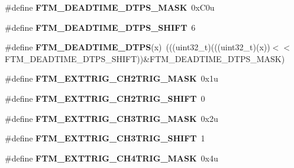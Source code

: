 \begin{DoxyCompactItemize}
\item 
\#define {\bfseries F\+T\+M\+\_\+\+D\+E\+A\+D\+T\+I\+M\+E\+\_\+\+D\+T\+P\+S\+\_\+\+M\+A\+SK}~0x\+C0u\hypertarget{group__FTM__Register__Masks_gae0402be742f84b93af5306ac6a61706f}{}\label{group__FTM__Register__Masks_gae0402be742f84b93af5306ac6a61706f}

\item 
\#define {\bfseries F\+T\+M\+\_\+\+D\+E\+A\+D\+T\+I\+M\+E\+\_\+\+D\+T\+P\+S\+\_\+\+S\+H\+I\+FT}~6\hypertarget{group__FTM__Register__Masks_gaa42cc1f2612186f882762059b910cd7a}{}\label{group__FTM__Register__Masks_gaa42cc1f2612186f882762059b910cd7a}

\item 
\#define {\bfseries F\+T\+M\+\_\+\+D\+E\+A\+D\+T\+I\+M\+E\+\_\+\+D\+T\+PS}(x)~(((uint32\+\_\+t)(((uint32\+\_\+t)(x))$<$$<$F\+T\+M\+\_\+\+D\+E\+A\+D\+T\+I\+M\+E\+\_\+\+D\+T\+P\+S\+\_\+\+S\+H\+I\+FT))\&F\+T\+M\+\_\+\+D\+E\+A\+D\+T\+I\+M\+E\+\_\+\+D\+T\+P\+S\+\_\+\+M\+A\+SK)\hypertarget{group__FTM__Register__Masks_gaf1a7c61f4e08ca45f70154070500695d}{}\label{group__FTM__Register__Masks_gaf1a7c61f4e08ca45f70154070500695d}

\item 
\#define {\bfseries F\+T\+M\+\_\+\+E\+X\+T\+T\+R\+I\+G\+\_\+\+C\+H2\+T\+R\+I\+G\+\_\+\+M\+A\+SK}~0x1u\hypertarget{group__FTM__Register__Masks_ga156b1af5902f975c8d6b667e77ce11da}{}\label{group__FTM__Register__Masks_ga156b1af5902f975c8d6b667e77ce11da}

\item 
\#define {\bfseries F\+T\+M\+\_\+\+E\+X\+T\+T\+R\+I\+G\+\_\+\+C\+H2\+T\+R\+I\+G\+\_\+\+S\+H\+I\+FT}~0\hypertarget{group__FTM__Register__Masks_ga6bd01126a4e39a0ccf9446da55a86c53}{}\label{group__FTM__Register__Masks_ga6bd01126a4e39a0ccf9446da55a86c53}

\item 
\#define {\bfseries F\+T\+M\+\_\+\+E\+X\+T\+T\+R\+I\+G\+\_\+\+C\+H3\+T\+R\+I\+G\+\_\+\+M\+A\+SK}~0x2u\hypertarget{group__FTM__Register__Masks_gaeec1aec17cdbd9a74b521b085dee6bf2}{}\label{group__FTM__Register__Masks_gaeec1aec17cdbd9a74b521b085dee6bf2}

\item 
\#define {\bfseries F\+T\+M\+\_\+\+E\+X\+T\+T\+R\+I\+G\+\_\+\+C\+H3\+T\+R\+I\+G\+\_\+\+S\+H\+I\+FT}~1\hypertarget{group__FTM__Register__Masks_ga9e1c577c8cb405f8e8b518445ca1139a}{}\label{group__FTM__Register__Masks_ga9e1c577c8cb405f8e8b518445ca1139a}

\item 
\#define {\bfseries F\+T\+M\+\_\+\+E\+X\+T\+T\+R\+I\+G\+\_\+\+C\+H4\+T\+R\+I\+G\+\_\+\+M\+A\+SK}~0x4u\hypertarget{group__FTM__Register__Masks_gaf8bedf8c8979cb1fa16cb9b35c7a4399}{}\label{group__FTM__Register__Masks_gaf8bedf8c8979cb1fa16cb9b35c7a4399}


\end{DoxyCompactItemize}
